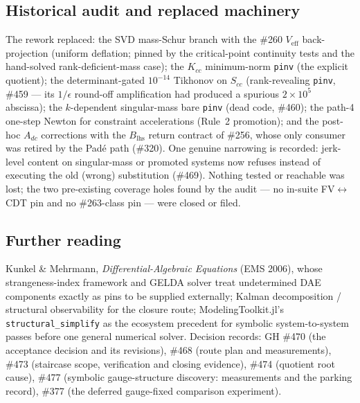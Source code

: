 \subsection{Historical audit and replaced machinery}
\label{sec:pencil-audit}

The rework replaced: the SVD mass-Schur branch with the \#260 $V_\text{eff}$
back-projection (uniform deflation; pinned by the critical-point
continuity tests and the hand-solved rank-deficient-mass case); the
$K_{cc}$ minimum-norm \texttt{pinv} (the explicit quotient); the
determinant-gated $10^{-14}$ Tikhonov on $S_{cc}$ (rank-revealing
\texttt{pinv}, \#459 --- its $1/\epsilon$ round-off amplification had
produced a spurious $2\times10^{5}$ abscissa); the $k$-dependent
singular-mass bare \texttt{pinv} (dead code, \#460); the path-4 one-step
Newton for constraint accelerations (Rule~2 promotion); and the
post-hoc $A_{dc}$ corrections with the $B_\text{lhs}$ return contract of
\#256, whose only consumer was retired by the Pad\'e path (\#320). One
genuine narrowing is recorded: jerk-level content on singular-mass or
promoted systems now refuses instead of executing the old (wrong)
substitution (\#469). Nothing tested or reachable was lost; the two
pre-existing coverage holes found by the audit --- no in-suite
FV$\leftrightarrow$CDT pin and no \#263-class pin --- were closed or
filed.

\subsection{Further reading}

Kunkel \& Mehrmann, \emph{Differential-Algebraic Equations} (EMS 2006),
whose strangeness-index framework and GELDA solver treat undetermined
DAE components exactly as pins to be supplied externally; Kalman
decomposition / structural observability for the closure route;
ModelingToolkit.jl's \texttt{structural\_simplify} as the ecosystem
precedent for symbolic system-to-system passes before one general
numerical solver. Decision records: GH \#470 (the acceptance decision and
its revisions), \#468 (route plan and measurements), \#473 (staircase
scope, verification and closing evidence), \#474 (quotient root cause),
\#477 (symbolic gauge-structure discovery: measurements and the parking
record), \#377 (the deferred gauge-fixed comparison experiment).
